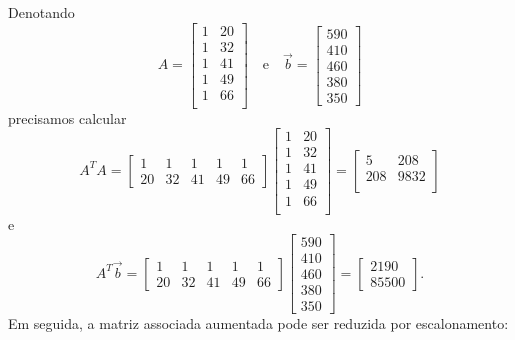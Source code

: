 \begin{ex}
  Denotando
  \begin{equation}
  A =
  \begin{bmatrix}
    1 & 20 \\
    1 & 32 \\
    1 & 41 \\
    1 & 49 \\
    1 & 66 \\
  \end{bmatrix} \quad \text{e} \quad
  \vec{b} =
  \begin{bmatrix}
    590 \\ 410 \\ 460 \\ 380 \\ 350
  \end{bmatrix}
  \end{equation} precisamos calcular
  \begin{equation}
  A^T A =
  \begin{bmatrix}
    1 & 1 & 1 & 1 & 1 \\
    20 & 32 & 41 & 49 & 66
  \end{bmatrix}
  \begin{bmatrix}
    1 & 20 \\
    1 & 32 \\
    1 & 41 \\
    1 & 49 \\
    1 & 66 \\
  \end{bmatrix} =
  \begin{bmatrix}
    5    & 208 \\
    208  & 9832  \\
  \end{bmatrix}
  \end{equation} e
  \begin{equation}
  A^T \vec{b} =
  \begin{bmatrix}
    1 & 1 & 1 & 1 & 1 \\
    20 & 32 & 41 & 49 & 66
  \end{bmatrix}
  \begin{bmatrix}
    590 \\ 410 \\ 460 \\ 380 \\ 350
  \end{bmatrix} =
  \begin{bmatrix}
    2190 \\ 85500
  \end{bmatrix}.
  \end{equation} Em seguida, a matriz associada aumentada pode ser reduzida por escalonamento:

\end{ex}
